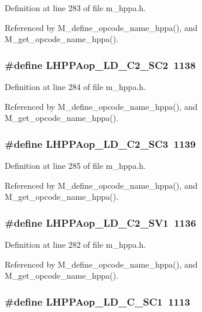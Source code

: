 Definition at line 283 of file m\_\-hppa.h.

Referenced by M\_\-define\_\-opcode\_\-name\_\-hppa(), and M\_\-get\_\-opcode\_\-name\_\-hppa().
\subsubsection{\setlength{\rightskip}{0pt plus 5cm}\#define LHPPAop\_\-LD\_\-C2\_\-SC2~1138}\label{m__hppa_8h_7ff88d6e9a89467d73bab77fdfb6c0f7}




Definition at line 284 of file m\_\-hppa.h.

Referenced by M\_\-define\_\-opcode\_\-name\_\-hppa(), and M\_\-get\_\-opcode\_\-name\_\-hppa().
\subsubsection{\setlength{\rightskip}{0pt plus 5cm}\#define LHPPAop\_\-LD\_\-C2\_\-SC3~1139}\label{m__hppa_8h_b477df76edaa06027b044bc1053cd4ee}




Definition at line 285 of file m\_\-hppa.h.

Referenced by M\_\-define\_\-opcode\_\-name\_\-hppa(), and M\_\-get\_\-opcode\_\-name\_\-hppa().
\subsubsection{\setlength{\rightskip}{0pt plus 5cm}\#define LHPPAop\_\-LD\_\-C2\_\-SV1~1136}\label{m__hppa_8h_37de7d57dd7ca60ac6e4481b7894a934}




Definition at line 282 of file m\_\-hppa.h.

Referenced by M\_\-define\_\-opcode\_\-name\_\-hppa(), and M\_\-get\_\-opcode\_\-name\_\-hppa().
\subsubsection{\setlength{\rightskip}{0pt plus 5cm}\#define LHPPAop\_\-LD\_\-C\_\-SC1~1113}\label{m__hppa_8h_21bb588d80d1d6f042c5dd51ea4fea4d}




